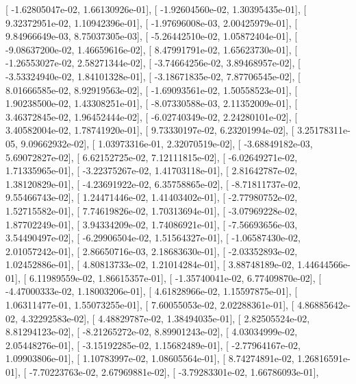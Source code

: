 \documentclass{article}
\begin{document}
       [ -1.62805047e-02,   1.66130926e-01],
       [ -1.92604560e-02,   1.30395435e-01],
       [  9.32372951e-02,   1.10942396e-01],
       [ -1.97696008e-03,   2.00425979e-01],
       [  9.84966649e-03,   8.75037305e-03],
       [ -5.26442510e-02,   1.05872404e-01],
       [ -9.08637200e-02,   1.46659616e-02],
       [  8.47991791e-02,   1.65623730e-01],
       [ -1.26553027e-02,   2.58271344e-02],
       [ -3.74664256e-02,   3.89468957e-02],
       [ -3.53324940e-02,   1.84101328e-01],
       [ -3.18671835e-02,   7.87706545e-02],
       [  8.01666585e-02,   8.92919563e-02],
       [ -1.69093561e-02,   1.50558523e-01],
       [  1.90238500e-02,   1.43308251e-01],
       [ -8.07330588e-03,   2.11352009e-01],
       [  3.46372845e-02,   1.96452444e-02],
       [ -6.02740349e-02,   2.24280101e-02],
       [  3.40582004e-02,   1.78741920e-01],
       [  9.73330197e-02,   6.23201994e-02],
       [  3.25178311e-05,   9.09662932e-02],
       [  1.03973316e-01,   2.32070519e-02],
       [ -3.68849182e-03,   5.69072827e-02],
       [  6.62152725e-02,   7.12111815e-02],
       [ -6.02649271e-02,   1.71335965e-01],
       [ -3.22375267e-02,   1.41703118e-01],
       [  2.81642787e-02,   1.38120829e-01],
       [ -4.23691922e-02,   6.35758865e-02],
       [ -8.71811737e-02,   9.55466743e-02],
       [  1.24471446e-02,   1.41403402e-01],
       [ -2.77980752e-02,   1.52715582e-01],
       [  7.74619826e-02,   1.70313694e-01],
       [ -3.07969228e-02,   1.87702249e-01],
       [  3.94334209e-02,   1.74086921e-01],
       [ -7.56693656e-03,   3.54490497e-02],
       [ -6.29906504e-02,   1.51564327e-01],
       [ -1.06587430e-02,   2.01057242e-01],
       [  2.86650716e-03,   2.18683630e-01],
       [ -2.03352893e-02,   1.02452886e-01],
       [  4.80813733e-02,   1.21014284e-01],
       [  3.88748189e-02,   1.44644566e-01],
       [  6.11989559e-02,   1.86615357e-01],
       [ -1.35740041e-02,   6.77409870e-02],
       [ -4.47000333e-02,   1.18003206e-01],
       [  4.61828966e-02,   1.15597875e-01],
       [  1.06311477e-01,   1.55073255e-01],
       [  7.60055053e-02,   2.02288361e-01],
       [  4.86885642e-02,   4.32292583e-02],
       [  4.48829787e-02,   1.38494035e-01],
       [  2.82505524e-02,   8.81294123e-02],
       [ -8.21265272e-02,   8.89901243e-02],
       [  4.03034999e-02,   2.05448276e-01],
       [ -3.15192285e-02,   1.15682489e-01],
       [ -2.77964167e-02,   1.09903806e-01],
       [  1.10783997e-02,   1.08605564e-01],
       [  8.74274891e-02,   1.26816591e-01],
       [ -7.70223763e-02,   2.67969881e-02],
       [ -3.79283301e-02,   1.66786093e-01],
\end{document}
